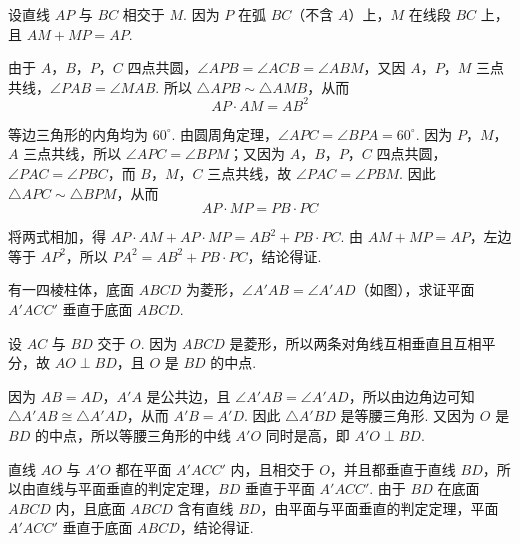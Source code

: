 \begin{solution}
设直线 \(AP\) 与 \(BC\) 相交于 \(M\). 因为 \(P\) 在弧 \(BC\)（不含 \(A\)）上，\(M\) 在线段 \(BC\) 上，且 \(AM+MP=AP\).



由于 \(A\)，\(B\)，\(P\)，\(C\) 四点共圆，\(\angle APB=\angle ACB=\angle ABM\)，又因 \(A\)，\(P\)，\(M\) 三点共线，\(\angle PAB=\angle MAB\). 所以 \(\triangle APB\sim\triangle AMB\)，从而
\[
AP\cdot AM=AB^{2}
\]

等边三角形的内角均为 \(60^{\circ}\). 由圆周角定理，\(\angle APC=\angle BPA=60^{\circ}\). 因为 \(P\)，\(M\)，\(A\) 三点共线，所以 \(\angle APC=\angle BPM\)；又因为 \(A\)，\(B\)，\(P\)，\(C\) 四点共圆，\(\angle PAC=\angle PBC\)，而 \(B\)，\(M\)，\(C\) 三点共线，故 \(\angle PAC=\angle PBM\). 因此 \(\triangle APC\sim\triangle BPM\)，从而
\[
AP\cdot MP=PB\cdot PC
\]

将两式相加，得 \(AP\cdot AM+AP\cdot MP=AB^{2}+PB\cdot PC\). 由 \(AM+MP=AP\)，左边等于 \(AP^{2}\)，所以 \(PA^{2}=AB^{2}+PB\cdot PC\)，结论得证.
\end{solution}

\begin{problem}
有一四棱柱体，底面 \(ABCD\) 为菱形，\(\angle A'AB=\angle A'AD\)（如图），求证平面 \(A'ACC'\) 垂直于底面 \(ABCD\).

\end{problem}

\begin{solution}
设 \(AC\) 与 \(BD\) 交于 \(O\). 因为 \(ABCD\) 是菱形，所以两条对角线互相垂直且互相平分，故 \(AO\perp BD\)，且 \(O\) 是 \(BD\) 的中点.



因为 \(AB=AD\)，\(A'A\) 是公共边，且 \(\angle A'AB=\angle A'AD\)，所以由边角边可知 \(\triangle A'AB\cong\triangle A'AD\)，从而 \(A'B=A'D\). 因此 \(\triangle A'BD\) 是等腰三角形. 又因为 \(O\) 是 \(BD\) 的中点，所以等腰三角形的中线 \(A'O\) 同时是高，即 \(A'O\perp BD\).

直线 \(AO\) 与 \(A'O\) 都在平面 \(A'ACC'\) 内，且相交于 \(O\)，并且都垂直于直线 \(BD\)，所以由直线与平面垂直的判定定理，\(BD\) 垂直于平面 \(A'ACC'\). 由于 \(BD\) 在底面 \(ABCD\) 内，且底面 \(ABCD\) 含有直线 \(BD\)，由平面与平面垂直的判定定理，平面 \(A'ACC'\) 垂直于底面 \(ABCD\)，结论得证.
\end{solution}

